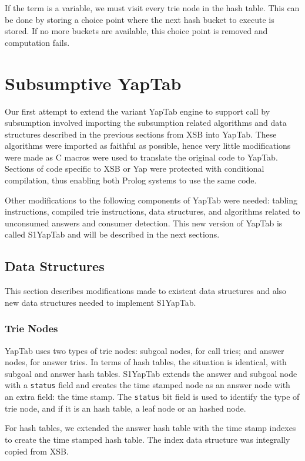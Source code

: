 If the term is a variable, we must visit every trie node in the hash table. This can be done
by storing a choice point where the next hash bucket to execute is stored. If no more
buckets are available, this choice point is removed and computation fails.

\section{Subsumptive YapTab}

Our first attempt to extend the variant YapTab engine to support call by subsumption
involved importing the subsumption related algorithms and data structures described in
the previous sections from XSB into YapTab. These algorithms were imported as faithful as possible,
hence very little modifications were made as C macros were used to translate the original
code to YapTab. Sections of code specific to XSB or Yap were protected with conditional
compilation, thus enabling both Prolog systems to use the same code.

Other modifications to the following components of YapTab were needed:
tabling instructions, compiled trie instructions, data structures, and algorithms
related to unconsumed answers and consumer detection.
This new version of YapTab is called S1YapTab and will be described in the next sections.

\subsection{Data Structures}

This section describes modifications made to existent data structures and also new 
data structures needed to implement S1YapTab.

\subsubsection{Trie Nodes}

YapTab uses two types of trie nodes: subgoal nodes, for call tries; and answer nodes, for
answer tries. In terms of hash tables, the situation is identical, with subgoal and answer
hash tables. S1YapTab extends the answer and subgoal node with a \texttt{status} field and
creates the time stamped node as an answer node with an extra field: the time stamp.
The \texttt{status} bit field is used to identify the type of trie node, and if it is
an hash table, a leaf node or an hashed node.

For hash tables, we extended the answer hash table with
the time stamp indexes to create the time stamped hash table.
The index data structure was integrally copied from XSB.

